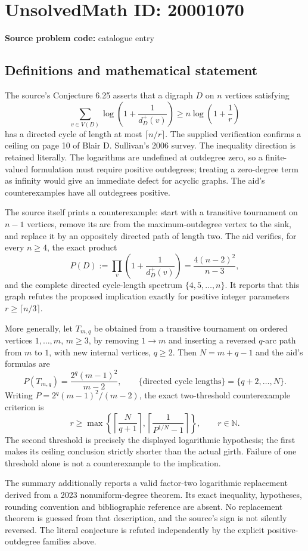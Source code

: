 \documentclass[11pt]{article}
\newcommand{\N}{\mathbb{N}}
\begin{document}
\section*{UnsolvedMath ID: 20001070}
\textbf{Source problem code:} catalogue entry
\subsection{Definitions and mathematical statement}
The source's Conjecture 6.25 asserts that a digraph $D$ on $n$ vertices satisfying
\[
 \sum_{v\in V(D)}\log\left(1+\frac1{d_D^+(v)}\right)
 \geq n\log\left(1+\frac1r\right)
\]
has a directed cycle of length at most $\lceil n/r\rceil$. The supplied verification confirms a ceiling on page 10 of Blair D. Sullivan's 2006 survey. The inequality direction is retained literally. The logarithms are undefined at outdegree zero, so a finite-valued formulation must require positive outdegrees; treating a zero-degree term as infinity would give an immediate defect for acyclic graphs. The aid's counterexamples have all outdegrees positive.

The source itself prints a counterexample: start with a transitive tournament on $n-1$ vertices, remove its arc from the maximum-outdegree vertex to the sink, and replace it by an oppositely directed path of length two. The aid verifies, for every $n\geq4$, the exact product
\[
 P(D):=\prod_v\left(1+\frac1{d_D^+(v)}\right)
       =\frac{4(n-2)^2}{n-3},
\]
and the complete directed cycle-length spectrum $\{4,5,\ldots,n\}$. It reports that this graph refutes the proposed implication exactly for positive integer parameters $r\geq\lceil n/3\rceil$.

More generally, let $T_{m,q}$ be obtained from a transitive tournament on ordered vertices $1,\ldots,m$, $m\geq3$, by removing $1\to m$ and inserting a reversed $q$-arc path from $m$ to $1$, with new internal vertices, $q\geq2$. Then $N=m+q-1$ and the aid's formulas are
\[
 P(T_{m,q})=\frac{2^q(m-1)^2}{m-2},\qquad
 \{\text{directed cycle lengths}\}=\{q+2,\ldots,N\}.
\]
Writing $P=2^q(m-1)^2/(m-2)$, the exact two-threshold counterexample criterion is
\[
 r\geq\max\left\{
 \left\lceil\frac N{q+1}\right\rceil,
 \left\lceil\frac1{P^{1/N}-1}\right\rceil
 \right\},\qquad r\in\N.
\]
The second threshold is precisely the displayed logarithmic hypothesis; the first makes its ceiling conclusion strictly shorter than the actual girth. Failure of one threshold alone is not a counterexample to the implication.

The summary additionally reports a valid factor-two logarithmic replacement derived from a 2023 nonuniform-degree theorem. Its exact inequality, hypotheses, rounding convention and bibliographic reference are absent. No replacement theorem is guessed from that description, and the source's sign is not silently reversed. The literal conjecture is refuted independently by the explicit positive-outdegree families above.
\end{document}
